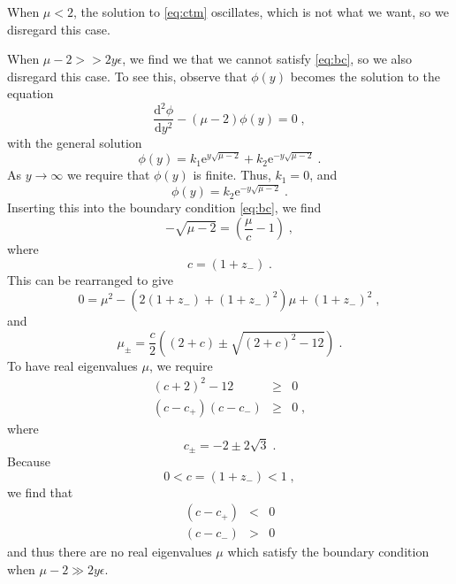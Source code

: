\documentclass[a4paper,10pt]{article}
\newcommand{\D}{\mathrm{d}}
\newcommand{\e}{\mathrm{e}}
\begin{document}
When $\mu < 2$, the solution to \eqref{eq:ctm} oscillates, which is not what we want, so we disregard this case. 

When $\mu - 2 >> 2y\epsilon$, we find we that we cannot satisfy \eqref{eq:bc}, so we also disregard this case. To see this, observe that $\phi(y)$ becomes the solution to the equation
\begin{equation}
  \frac{\D^2 \phi}{\D y^2} - (\mu-2) \phi(y) = 0 \;,
\end{equation}
with the general solution
\begin{equation}
  \phi(y) = k_1 \e^{y\sqrt{\mu-2}} + k_2 \e^{-y\sqrt{\mu-2}} \;.
\end{equation}
As $y\to\infty$ we require that $\phi(y)$ is finite. Thus, $k_1 = 0$, and
\begin{equation}
  \phi(y) = k_2 \e^{-y\sqrt{\mu-2}} \;.
\end{equation}
Inserting this into the boundary condition \eqref{eq:bc}, we find
\begin{equation}
 -\sqrt{\mu-2} =\left( \frac{\mu}{c} -1 \right) \;,
\end{equation}
where
\begin{equation}
  c = (1+z_-) \;.
\end{equation}
This can be rearranged to give
\begin{equation}
  0 = \mu^2 - (2(1+z_-) + (1+z_-)^2)\mu + (1+z_-)^2 \;,
\end{equation}
and
\begin{equation}
  \mu_\pm = \frac{c}{2} \left( (2+c) \pm \sqrt{ (2+c)^2 - 12}  \right)\;.
\end{equation}
To have real eigenvalues $\mu$, we require
\begin{eqnarray}
  (c+2)^2 - 12 & \ge & 0 \nonumber \\
  (c - c_+)(c-c_-) & \ge & 0 \;,
\end{eqnarray}
where
\begin{equation}
  c_\pm = -2 \pm 2 \sqrt{3} \;.
\end{equation}
Because
\begin{equation}
  0 < c = (1+z_-) < 1 \;,
\end{equation}
we find that
\begin{eqnarray}
  (c-c_+) & < & 0  \nonumber \\
  (c-c_-) & > & 0
\end{eqnarray}
and thus there are no real eigenvalues $\mu$ which satisfy the boundary condition when $\mu - 2 \gg 2y\epsilon$.
\end{document}
